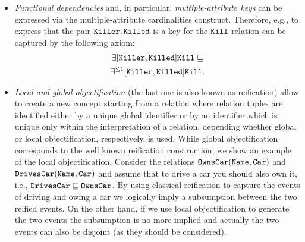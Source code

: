 \documentclass[draft]{article}
\newcommand{\lreif}[1]{\ensuremath{\bigodot#1}}
\begin{document}
\begin{itemize}
%
%
	\item \emph{Functional dependencies} and, in particular, \emph{multiple-attribute keys} can be expressed via the multiple-attribute cardinalities construct. Therefore, e.g., to express that the pair ${\tt Killer, Killed}$ is a key for the ${\tt Kill}$ relation can be captured by the following axiom:
%
  \begin{multline*}
    \exists [{\tt Killer, Killed}]\tt Kill \sqsubseteq \\
    \exists^{\leq 1}[{\tt Killer, Killed}]{\tt Kill}.
  \end{multline*}
%
%
	\item \emph{Local and global objectification} (the last one is also known as reification) allow to create a new concept starting from a relation where relation tuples are identified either by a unique global identifier or by an identifier which is unique only within the interpretation of a relation, depending whether global or local objectification, respectively, is used. While global objectification corresponds to the well known reification construction, we show an example of the local objectification. Consider the relations ${\tt OwnsCar(Name, Car)}$ and ${\tt DrivesCar(Name, Car)}$ and assume that to drive a car you should also own it, i.e., ${\tt DrivesCar\sqsubseteq OwnsCar}$. By using classical reification to capture the events of driving and owing a car we logically imply a subsumption between the two reified events. On the other hand, if we use local objectification to generate the two events the subsumption is no more implied and actually the two events can also be disjoint (as they should be considered).


\end{itemize}
\end{document}
